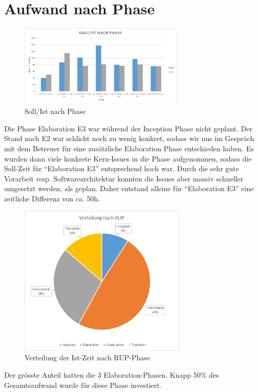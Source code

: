 	\section{Aufwand nach Phase}
        \begin{figure}
            \vspace{-25pt}
            \begin{center}
                \includegraphics[width=0.7\textwidth]{content/schlussbericht/images/zeit_nach_phase.png}
            \end{center}
            \vspace{-20pt}
            \caption{Soll/Ist nach Phase}
        \end{figure}
        Die Phase Elaboration E3 war während der Inception Phase nicht geplant. Der Stand nach E2 war schlicht noch zu wenig konkret, sodass wir uns im Gespräch mit dem Betreuer für eine zusätzliche Elaboration Phase entschieden haben. Es wurden dann viele konkrete Kern-Issues in die Phase aufgenommen, sodass die Soll-Zeit für \enquote{Elaboration E3} entsprechend hoch war. Durch die sehr gute Vorarbeit resp. Softwarearchitektur konnten die Issues aber massiv schneller umgesetzt werden, als geplan. Daher entstand alleine für \enquote{Elaboration E3} eine zeitliche Differenz von ca. 50h.
	

        \newpage
        \begin{figure}
            \vspace{-25pt}
            \begin{center}
                \includegraphics[width=8cm]{content/schlussbericht/images/verteilung_nach_rup.png}
            \end{center}
            \vspace{-20pt}
            \caption{Verteilung der Ist-Zeit nach RUP-Phase}
        \end{figure}
        Der grösste Anteil hatten die 3 Elaboration-Phasen. Knapp  50\% des Gesamtsaufwand wurde für diese Phase investiert.
        \vspace{6cm}

